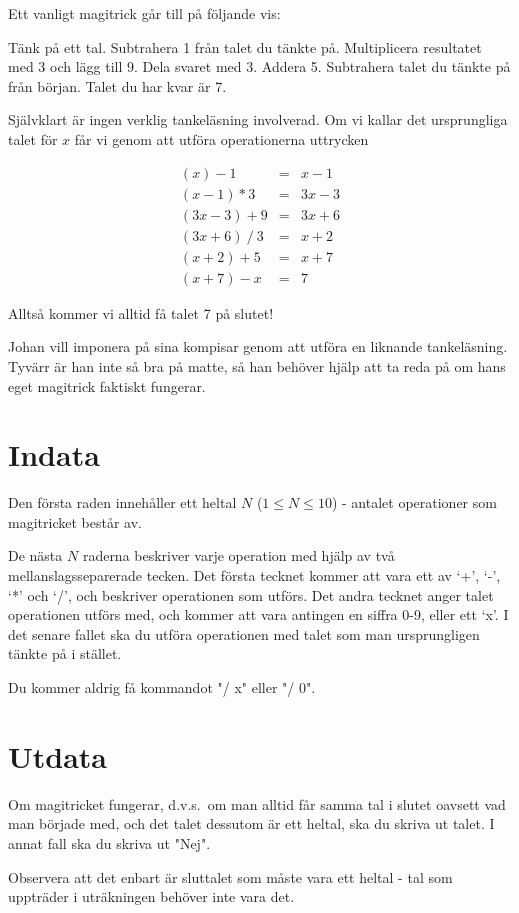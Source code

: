 
Ett vanligt magitrick går till på följande vis:

Tänk på ett tal. Subtrahera 1 från talet du tänkte på. Multiplicera resultatet med 3 och lägg till 9. Dela svaret med 3. Addera 5. Subtrahera talet du tänkte på från början. Talet du har kvar är 7.

Självklart är ingen verklig tankeläsning involverad. Om vi kallar det ursprungliga talet för $x$ får vi genom att utföra operationerna uttrycken

\[\begin{array}{rcl}
(x) - 1 & = & x - 1 \\
(x - 1) * 3 & = & 3x - 3 \\
(3x - 3) + 9 & = & 3x + 6 \\
(3x + 6)\ /\ 3 & = & x + 2 \\
(x + 2) + 5 & = & x + 7 \\
(x + 7) - x & = & 7
\end{array}\]

Alltså kommer vi alltid få talet 7 på slutet!

Johan vill imponera på sina kompisar genom att utföra en liknande tankeläsning. Tyvärr är han inte så bra på matte, så han behöver hjälp att ta reda på om hans eget magitrick faktiskt fungerar.

\section*{Indata}

Den första raden innehåller ett heltal $N$ ($1 \le N \le 10$) - antalet operationer som magitricket består av.

De nästa $N$ raderna beskriver varje operation med hjälp av två mellanslagsseparerade tecken. Det första tecknet kommer att vara ett av `+', `-', `*' och `/', och beskriver operationen som utförs. Det andra tecknet anger talet operationen utförs med, och kommer att vara antingen en siffra 0-9, eller ett `x'. I det senare fallet ska du utföra operationen med talet som man ursprungligen tänkte på i stället.

Du kommer aldrig få kommandot "/ x" eller "/ 0".

\section*{Utdata}

Om magitricket fungerar, d.v.s.\ om man alltid får samma tal i slutet oavsett vad man började med, och det talet dessutom är ett heltal, ska du skriva ut talet. I annat fall ska du skriva ut "Nej".

Observera att det enbart är sluttalet som måste vara ett heltal - tal som uppträder i uträkningen behöver inte vara det.
